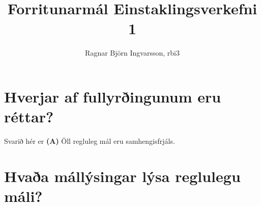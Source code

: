 \documentclass[leqno]{article}
\title{Forritunarmál Einstaklingsverkefni 1}
\author{Ragnar Björn Ingvarsson, rbi3}
\begin{document}
	
	\maketitle

	\newpage
	
		\section{Hverjar af fullyrðingunum eru réttar?}

		Svarið hér er \textbf{(A)} Öll regluleg mál eru samhengisfrjáls.

		\section{Hvaða mállýsingar lýsa reglulegu máli?}

\vspace{2em}
\end{document}
